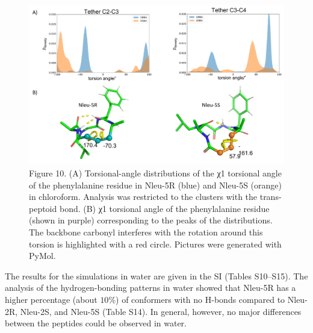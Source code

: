\begin{figure}
    \centering
    \includegraphics[width=\textwidth]{7_chapter_5/fig/results/dihedral_dist.png}
    \caption{Figure 10. (A) Torsional-angle distributions of the χ1 torsional angle of the phenylalanine residue in Nleu-5R (blue) and Nleu-5S (orange) in chloroform. Analysis was restricted to the clusters with the trans-peptoid bond. (B) χ1 torsional angle of the phenylalanine residue (shown in purple) corresponding to the peaks of the distributions. The backbone carbonyl interferes with the rotation around this torsion is highlighted with a red circle. Pictures were generated with PyMol. \cite{Delano2020}}
    \label{fig: dihedralDistSubst}
\end{figure}


The results for the simulations in water are given in the SI (Tables S10–S15). The analysis of the hydrogen-bonding patterns in water showed that Nleu-5R has a higher percentage (about $10\%$) of conformers with no H-bonds compared to Nleu-2R, Nleu-2S, and Nleu-5S (Table S14). In general, however, no major differences between the peptides could be observed in water.

\begin{table}[]
\centering
\caption{Percentage of sampled conformations with zero, one, or two hydrogen bonds 
for  Nleu-5R,  Nleu-5S,  Nleu-2R,  and  Nleu-2S  in  water.  Analysis  was  restricted  to  the 
clusters with the trans-peptoid bond.}
\label{tab: SIhydrogenBondsWater}
\end{table}



